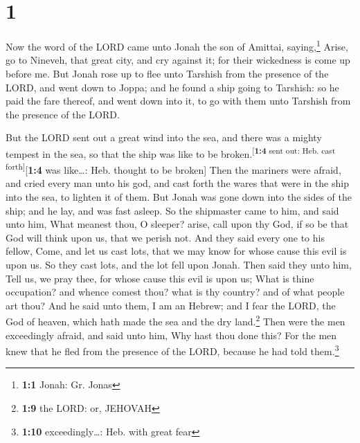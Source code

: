 \hypertarget{section}{%
\section{1}\label{section}}

 Now the word of the LORD came unto Jonah the son of
Amittai, saying,\footnote{\textbf{1:1} Jonah: Gr. Jonas} 
Arise, go to Nineveh, that great city, and cry against it; for their
wickedness is come up before me.  But Jonah rose up to
flee unto Tarshish from the presence of the LORD, and went down to
Joppa; and he found a ship going to Tarshish: so he paid the fare
thereof, and went down into it, to go with them unto Tarshish from the
presence of the LORD.

 But the LORD sent out a great wind into the sea, and
there was a mighty tempest in the sea, so that the ship was like to be
broken.\textsuperscript{{[}\textbf{1:4} sent out: Heb. cast
forth{]}}{[}\textbf{1:4} was like\ldots: Heb. thought to be broken{]}
 Then the mariners were afraid, and cried every man unto
his god, and cast forth the wares that were in the ship into the sea, to
lighten it of them. But Jonah was gone down into the sides of the ship;
and he lay, and was fast asleep.  So the shipmaster came
to him, and said unto him, What meanest thou, O sleeper? arise, call
upon thy God, if so be that God will think upon us, that we perish not.
 And they said every one to his fellow, Come, and let us
cast lots, that we may know for whose cause this evil is upon us. So
they cast lots, and the lot fell upon Jonah.  Then said
they unto him, Tell us, we pray thee, for whose cause this evil is upon
us; What is thine occupation? and whence comest thou? what is thy
country? and of what people art thou?  And he said unto
them, I am an Hebrew; and I fear the LORD, the God of heaven, which hath
made the sea and the dry land.\footnote{\textbf{1:9} the LORD: or,
  JEHOVAH}  Then were the men exceedingly afraid, and
said unto him, Why hast thou done this? For the men knew that he fled
from the presence of the LORD, because he had told them.\footnote{\textbf{1:10}
  exceedingly\ldots: Heb. with great fear}

